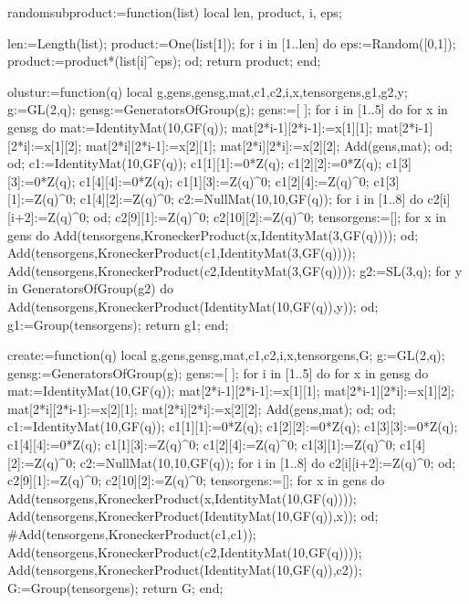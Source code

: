 
randomsubproduct:=function(list)
local len, product, i, eps;

len:=Length(list);
product:=One(list[1]);
for i in [1..len] do
    eps:=Random([0,1]);
    product:=product*(list[i]^eps);
od;
return product;
end;



olustur:=function(q)
local g,gens,gensg,mat,c1,c2,i,x,tensorgens,g1,g2,y;
g:=GL(2,q);
gensg:=GeneratorsOfGroup(g);
gens:=[ ];
for i in [1..5] do 
     for x in gensg do
          mat:=IdentityMat(10,GF(q));
                   mat[2*i-1][2*i-1]:=x[1][1];
                   mat[2*i-1][2*i]:=x[1][2];
                   mat[2*i][2*i-1]:=x[2][1];
                   mat[2*i][2*i]:=x[2][2];
          Add(gens,mat);
      od;
od;
c1:=IdentityMat(10,GF(q));
c1[1][1]:=0*Z(q);
c1[2][2]:=0*Z(q);
c1[3][3]:=0*Z(q);
c1[4][4]:=0*Z(q);
c1[1][3]:=Z(q)^0;
c1[2][4]:=Z(q)^0;
c1[3][1]:=Z(q)^0;
c1[4][2]:=Z(q)^0;
c2:=NullMat(10,10,GF(q));
for i in [1..8] do
     c2[i][i+2]:=Z(q)^0;
od;
c2[9][1]:=Z(q)^0;
c2[10][2]:=Z(q)^0;
tensorgens:=[];
for x in gens do 
     Add(tensorgens,KroneckerProduct(x,IdentityMat(3,GF(q))));
od;
Add(tensorgens,KroneckerProduct(c1,IdentityMat(3,GF(q))));
Add(tensorgens,KroneckerProduct(c2,IdentityMat(3,GF(q))));
g2:=SL(3,q);
for y in GeneratorsOfGroup(g2) do
     Add(tensorgens,KroneckerProduct(IdentityMat(10,GF(q)),y));
od;
g1:=Group(tensorgens);
return g1;
end;

create:=function(q)
local g,gens,gensg,mat,c1,c2,i,x,tensorgens,G;
g:=GL(2,q);
gensg:=GeneratorsOfGroup(g);
gens:=[ ];
for i in [1..5] do 
     for x in gensg do
          mat:=IdentityMat(10,GF(q));
                   mat[2*i-1][2*i-1]:=x[1][1];
                   mat[2*i-1][2*i]:=x[1][2];
                   mat[2*i][2*i-1]:=x[2][1];
                   mat[2*i][2*i]:=x[2][2];
          Add(gens,mat);
      od;
od;
c1:=IdentityMat(10,GF(q));
c1[1][1]:=0*Z(q);
c1[2][2]:=0*Z(q);
c1[3][3]:=0*Z(q);
c1[4][4]:=0*Z(q);
c1[1][3]:=Z(q)^0;
c1[2][4]:=Z(q)^0;
c1[3][1]:=Z(q)^0;
c1[4][2]:=Z(q)^0;
c2:=NullMat(10,10,GF(q));
for i in [1..8] do
     c2[i][i+2]:=Z(q)^0;
od;
c2[9][1]:=Z(q)^0;
c2[10][2]:=Z(q)^0;
tensorgens:=[];
for x in gens do 
     Add(tensorgens,KroneckerProduct(x,IdentityMat(10,GF(q))));
     Add(tensorgens,KroneckerProduct(IdentityMat(10,GF(q)),x));
od;
#Add(tensorgens,KroneckerProduct(c1,c1));
Add(tensorgens,KroneckerProduct(c2,IdentityMat(10,GF(q))));
Add(tensorgens,KroneckerProduct(IdentityMat(10,GF(q)),c2));
G:=Group(tensorgens);
return G;
end;


